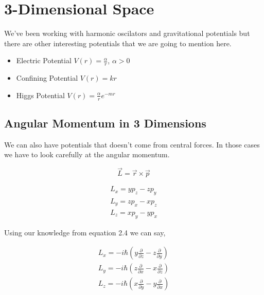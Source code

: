 \setchapterpreamble[u]{\margintoc}
\chapter{3-Dimensional Space}


We've been working with harmonic oscilators and gravitational potentials but there are other interesting potentials that we are going to mention here.

\begin{itemize}
  \item Electric Potential $V(r) = \frac{\alpha}{r}$, $\alpha>0$
  \item Confining Potential $V(r) = k r$
  \item Higgs Potential $V(r) = \frac{\alpha}{r} e^{-mr}$
\end{itemize}


\section{Angular Momentum in 3 Dimensions}

We can also have potentials that doesn't come from central forces. In those cases we have to look carefully at the angular momentum.

\begin{equation}
  \vec{L} = \vec{r} \times \vec{p}
\end{equation}

\begin{equation}
  \begin{array}{c}
    L_x = y p_z - z p_y\\
    L_y = z p_x - x p_z\\
    L_z = x p_y - y p_x
  \end{array}
\end{equation}

Using our knowledge from equation 2.4 we can say,

\begin{equation}
  \begin{array}{c}
    L_x = -i \hbar (y \frac{\partial}{\partial z} - z \frac{\partial}{\partial y})\\
    L_y = -i \hbar (z \frac{\partial}{\partial x} - x \frac{\partial}{\partial z})\\
    L_z = -i \hbar (x \frac{\partial}{\partial y} - y \frac{\partial}{\partial x})
  \end{array}
\end{equation}


